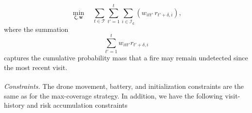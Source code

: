 \documentclass[pdflatex,sn-mathphys-num]{sn-jnl}%
\theoremstyle{thmstyleone}%
\theoremstyle{thmstyletwo}%
\theoremstyle{thmstylethree}%
\begin{document}
\begin{equation}
\label{eq:routing_obj_paper}
\min_{\bm \zeta, \bm w} \quad 
\sum_{t \in \mathcal{T}}
\sum_{t'=1}^{t}
\sum_{i \in \mathcal{I}_{\text{d}}}
\left(
w_{itt'}\, r_{t'+\delta,i}
\right),
\end{equation}
where the summation
\[
\sum_{t'=1}^{t} w_{itt'} r_{t'+\delta,i}
\]
captures the cumulative probability mass that a fire may remain undetected since the most recent visit. 
\\
\\
\textit{Constraints.} The drone movement, battery, and initialization constraints are the same as for the max-coverage strategy. In addition, we have the following visit-history and risk accumulation constraints
\end{document}
